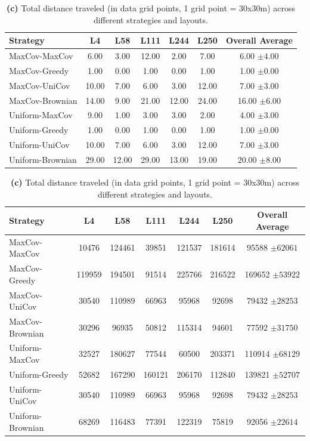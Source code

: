 \documentclass{article}
\begin{document}
\begin{table}[htbp]
\begin{minipage}{\textwidth}
\centering
\small
\setlength{\tabcolsep}{4pt}
\begin{tabular}{lccccc c}
\toprule
\textbf{Strategy} & \textbf{L4} & \textbf{L58} & \textbf{L111} & \textbf{L244} & \textbf{L250} & \textbf{Overall Average} \\
\midrule
MaxCov-MaxCov     & 6.00  & 3.00 & 12.00  & 2.00 & 7.00 & 6.00 $\pm 4.00$ \\
MaxCov-Greedy     & 1.00  & 0.00 & 1.00  & 0.00 & 1.00 & 1.00 $\pm 0.00$ \\
MaxCov-UniCov     & 10.00  & 7.00 & 6.00  & 3.00 & 12.00 & 7.00 $\pm 3.00$ \\
MaxCov-Brownian   & 14.00  & 9.00 & 21.00  & 12.00 & 24.00 & 16.00 $\pm 6.00$ \\
Uniform-MaxCov    & 9.00  & 1.00 & 3.00  & 3.00 & 2.00 & 4.00 $\pm 3.00$ \\
Uniform-Greedy    & 1.00  & 0.00 & 1.00  & 0.00 & 1.00 & 1.00 $\pm 0.00$ \\
Uniform-UniCov    & 10.00  & 7.00 & 6.00  & 3.00 & 12.00 & 7.00 $\pm 3.00$ \\
Uniform-Brownian  & 29.00  & 12.00 & 29.00  & 13.00 & 19.00 & 20.00 $\pm 8.00$ \\
\bottomrule
\end{tabular}

\caption*{\textbf{(b)} Map area explored across different strategies and layouts.}
\vspace{1em}
\end{minipage}

\begin{minipage}{\textwidth}
\centering
\small
\setlength{\tabcolsep}{4pt}
\begin{tabular}{lccccc c}
\toprule
\textbf{Strategy} & \textbf{L4} & \textbf{L58} & \textbf{L111} & \textbf{L244} & \textbf{L250} & \textbf{Overall Average} \\
\midrule
MaxCov-MaxCov     & 10476  & 124461 & 39851  & 121537 & 181614 & 95588 $\pm 62061$ \\
MaxCov-Greedy     & 119959 & 194501 & 91514  & 225766 & 216522 & 169652 $\pm 53922$ \\
MaxCov-UniCov     & 30540  & 110989 & 66963  & 95968  & 92698  & 79432 $\pm 28253$ \\
MaxCov-Brownian   & 30296  & 96935  & 50812  & 115314 & 94601  & 77592 $\pm 31750$ \\
Uniform-MaxCov    & 32527  & 180627 & 77544  & 60500  & 203371 & 110914 $\pm 68129$ \\
Uniform-Greedy    & 52682  & 167290 & 160121 & 206170 & 112840 & 139821 $\pm 52707$ \\
Uniform-UniCov    & 30540  & 110989 & 66963  & 95968  & 92698  & 79432 $\pm 28253$ \\
Uniform-Brownian  & 68269  & 116483 & 77391  & 122319 & 75819  & 92056 $\pm 22614$ \\
\bottomrule
\end{tabular}
\caption*{\textbf{(c)} Total distance traveled (in data grid points, 1 grid point = 30x30m) across different strategies and layouts.}
\end{minipage}


\end{table}
\end{document}
